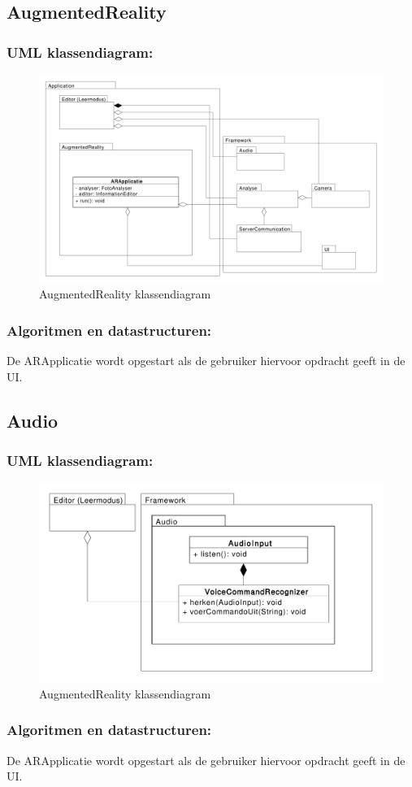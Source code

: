 \documentclass[12pt,a4paper,oneside]{article}
\begin{document}
\subsection{AugmentedReality}
\subsubsection*{UML klassendiagram:}
\begin{figure}[H]
  \begin{center}
    \includegraphics[scale=0.4]{AugmentedReality.pdf}
    \caption{AugmentedReality klassendiagram}
    \label{graph:graph2}
  \end{center}
\end{figure}
\subsubsection*{Algoritmen en datastructuren:}
De ARApplicatie wordt opgestart als de gebruiker hiervoor opdracht geeft in de UI.
\subsection{Audio}
\subsubsection*{UML klassendiagram:}
\begin{figure}[H]
  \begin{center}
    \includegraphics[scale=0.4]{Audio.pdf}
    \caption{AugmentedReality klassendiagram}
    \label{graph:graph2}
  \end{center}
\end{figure}
\subsubsection*{Algoritmen en datastructuren:}
De ARApplicatie wordt opgestart als de gebruiker hiervoor opdracht geeft in de UI.
\end{document}

